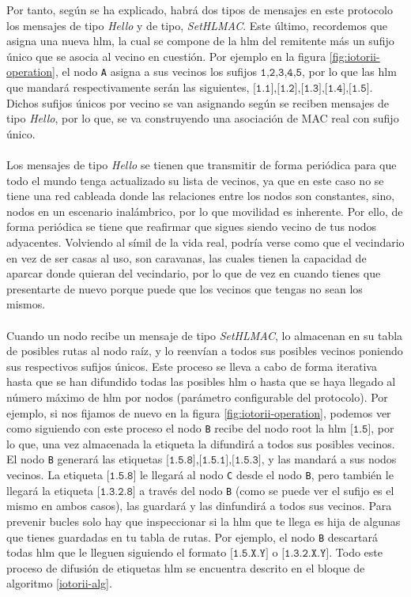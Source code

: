 Por tanto, según se ha explicado, habrá dos tipos de mensajes en este protocolo los mensajes de tipo \textit{Hello} y de tipo, \textit{SetHLMAC}. Este último, recordemos que asigna una nueva \gls{hlm}, la cual se compone de la \gls{hlm} del remitente más un sufijo único que se asocia al vecino en cuestión. Por ejemplo en la figura \ref{fig:iotorii-operation}, el nodo \texttt{A} asigna a sus vecinos los sufijos $\texttt{1,2,3,4,5}$, por lo que las  \gls{hlm} que mandará respectivamente serán las siguientes, $\texttt{[1.1],[1.2],[1.3],[1.4],[1.5]}$. Dichos sufijos únicos por vecino se van asignando según se reciben mensajes de tipo \textit{Hello}, por lo que, se va construyendo una asociación de MAC real con sufijo único.\\
\\
Los mensajes de tipo \textit{Hello} se tienen que transmitir de forma periódica para que todo el mundo tenga actualizado su lista de vecinos, ya que en este caso no se tiene una red cableada donde las relaciones entre los nodos son constantes, sino, nodos en un escenario inalámbrico, por lo que movilidad es inherente. Por ello, de forma periódica se tiene que reafirmar que sigues siendo vecino de tus nodos adyacentes. Volviendo al símil de la vida real, podría verse como que el vecindario en vez de ser casas al uso, son caravanas, las cuales tienen la capacidad de aparcar donde quieran del vecindario, por lo que de vez en cuando tienes que presentarte de nuevo porque puede que los vecinos que tengas no sean los mismos.\\
\\
Cuando un nodo recibe un mensaje de tipo \textit{SetHLMAC}, lo almacenan en su  tabla de posibles rutas al nodo raíz, y lo reenvían a todos sus posibles vecinos poniendo sus respectivos sufijos únicos. Este proceso se lleva a cabo de forma iterativa hasta que se han difundido todas las posibles \gls{hlm} o hasta que se haya llegado al número máximo de \gls{hlm} por nodos (parámetro configurable del protocolo). Por ejemplo, si nos fijamos de nuevo en la figura \ref{fig:iotorii-operation}, podemos ver como siguiendo con este proceso el nodo \texttt{B} recibe del nodo root la \gls{hlm} $\texttt{[1.5]}$, por lo que, una vez almacenada la etiqueta la difundirá a todos sus posibles vecinos. El nodo \texttt{B} generará las etiquetas $\texttt{[1.5.8],[1.5.1],[1.5.3]}$, y las mandará a sus nodos vecinos. La etiqueta $\texttt{[1.5.8]}$ le llegará al nodo \texttt{C} desde el nodo \texttt{B}, pero también le llegará la etiqueta $\texttt{[1.3.2.8]}$ a través del nodo \texttt{B} (como se puede ver el sufijo es el mismo en ambos casos), las guardará y las dinfundirá a todos sus vecinos. Para prevenir bucles solo hay que inspeccionar si la \gls{hlm} que te llega es hija de algunas que tienes guardadas en tu tabla de rutas. Por ejemplo, el nodo \texttt{B} descartará todas \gls{hlm} que le lleguen siguiendo el formato $\texttt{[1.5.X.Y]}$ o $\texttt{[1.3.2.X.Y]}$. Todo este proceso de difusión de etiquetas \gls{hlm} se encuentra descrito en el bloque de algoritmo \ref{iotorii-alg}.\\
